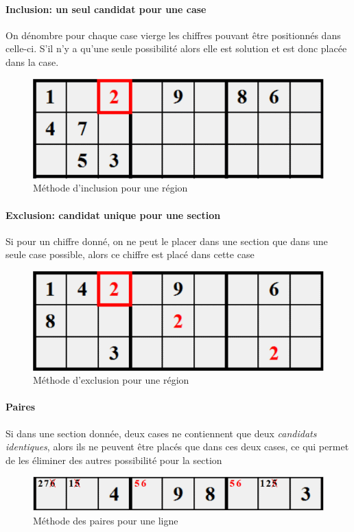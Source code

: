\documentclass[12pt,a4paper]{report}
\begin{document}
\paragraph{Inclusion: un seul candidat pour une case}
On dénombre pour chaque case vierge les chiffres pouvant être positionnés dans celle-ci. S'il n'y a qu'une seule possibilité alors elle est solution et est donc placée dans la case.
\begin{figure}[!h]
 \center
 \includegraphics[scale=0.8]{../pictures/inclusion}
 \caption{Méthode d'inclusion pour une région}
\end{figure}

\paragraph{Exclusion: candidat unique pour une section}
Si pour un chiffre donné, on ne peut le placer dans une section que dans une seule case possible, alors ce chiffre est placé dans cette case
\begin{figure}[!h]
 \center
 \includegraphics[scale=0.8]{../pictures/exclusion}
 \caption{Méthode d'exclusion pour une région}
\end{figure}

\paragraph{Paires} Si dans une section donnée, deux cases ne contiennent que deux \emph{candidats identiques}, alors ils ne peuvent être placés que dans ces deux cases, ce qui permet de les éliminer des autres possibilité pour la section
\begin{figure}[!h]
 \center
 \includegraphics[scale=0.8]{../pictures/paire}
 \caption{Méthode des paires pour une ligne}
\end{figure}
\end{document}
